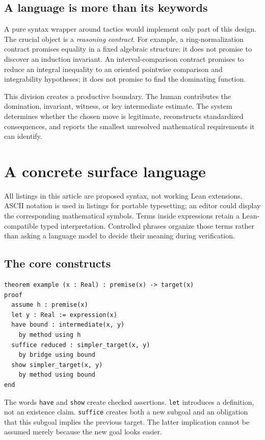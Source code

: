 \documentclass[11pt,a4paper]{article}
\newcommand{\code}[1]{\texttt{\small #1}}
\theoremstyle{definition}
\theoremstyle{remark}
\begin{document}
\subsection{A language is more than its keywords}
A pure syntax wrapper around tactics would implement only part of this design. The crucial object is a \emph{reasoning contract}. For example, a ring-normalization contract promises equality in a fixed algebraic structure; it does not promise to discover an induction invariant. An interval-comparison contract promises to reduce an integral inequality to an oriented pointwise comparison and integrability hypotheses; it does not promise to find the dominating function.

This division creates a productive boundary. The human contributes the domination, invariant, witness, or key intermediate estimate. The system determines whether the chosen move is legitimate, reconstructs standardized consequences, and reports the smallest unresolved mathematical requirements it can identify.

\section{A concrete surface language}
\label{sec:syntax}
All listings in this article are proposed syntax, not working Lean extensions. ASCII notation is used in listings for portable typesetting; an editor could display the corresponding mathematical symbols. Terms inside expressions retain a Lean-compatible typed interpretation. Controlled phrases organize those terms rather than asking a language model to decide their meaning during verification.

\subsection{The core constructs}
\begin{lstlisting}
theorem example (x : Real) : premise(x) -> target(x)
proof
  assume h : premise(x)
  let y : Real := expression(x)
  have bound : intermediate(x, y)
    by method using h
  suffice reduced : simpler_target(x, y)
    by bridge using bound
  show simpler_target(x, y)
    by method using bound
end
\end{lstlisting}

The words \code{have} and \code{show} create checked assertions. \code{let} introduces a definition, not an existence claim. \code{suffice} creates both a new subgoal and an obligation that this subgoal implies the previous target. The latter implication cannot be assumed merely because the new goal looks easier.
\end{document}
